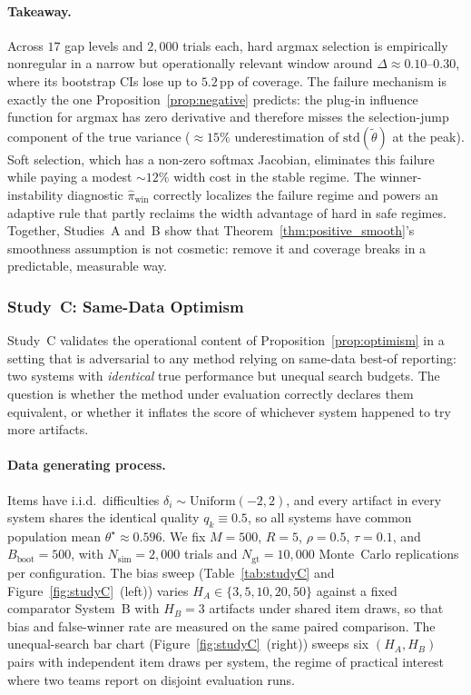 \paragraph{Takeaway.}
Across $17$ gap levels and $2{,}000$ trials each, hard argmax selection is empirically nonregular in a narrow but operationally relevant window around $\Delta\approx 0.10$--$0.30$, where its bootstrap CIs lose up to $5.2$\,pp of coverage.
The failure mechanism is exactly the one Proposition~\ref{prop:negative} predicts: the plug-in influence function for argmax has zero derivative and therefore misses the selection-jump component of the true variance ($\approx 15\%$ underestimation of $\mathrm{std}(\widetilde\theta)$ at the peak).
Soft selection, which has a non-zero softmax Jacobian, eliminates this failure while paying a modest $\sim 12\%$ width cost in the stable regime.
The winner-instability diagnostic $\widehat\pi_{\mathrm{win}}$ correctly localizes the failure regime and powers an adaptive rule that partly reclaims the width advantage of hard in safe regimes.
Together, Studies~A and~B show that Theorem~\ref{thm:positive_smooth}'s smoothness assumption is not cosmetic: remove it and coverage breaks in a predictable, measurable way.

\subsubsection{Study~C: Same-Data Optimism}
\label{sec:studyC}

Study~C validates the operational content of Proposition~\ref{prop:optimism} in a setting that is adversarial to any method relying on same-data best-of reporting: two systems with \emph{identical} true performance but unequal search budgets. The question is whether the method under evaluation correctly declares them equivalent, or whether it inflates the score of whichever system happened to try more artifacts.

\paragraph{Data generating process.}
Items have i.i.d.\ difficulties $\delta_i \sim \text{Uniform}(-2, 2)$, and every artifact in every system shares the identical quality $q_k \equiv 0.5$, so all systems have common population mean $\theta^\star \approx 0.596$.
We fix $M{=}500$, $R{=}5$, $\rho{=}0.5$, $\tau{=}0.1$, and $B_{\mathrm{boot}}{=}500$, with $N_{\mathrm{sim}}{=}2{,}000$ trials and $N_{\mathrm{gt}}{=}10{,}000$ Monte~Carlo replications per configuration.
The bias sweep (Table~\ref{tab:studyC} and Figure~\ref{fig:studyC}~(left)) varies $H_A\in\{3,5,10,20,50\}$ against a fixed comparator System~B with $H_B{=}3$ artifacts under shared item draws, so that bias and false-winner rate are measured on the same paired comparison.
The unequal-search bar chart (Figure~\ref{fig:studyC}~(right)) sweeps six $(H_A,H_B)$ pairs with independent item draws per system, the regime of practical interest where two teams report on disjoint evaluation runs.

